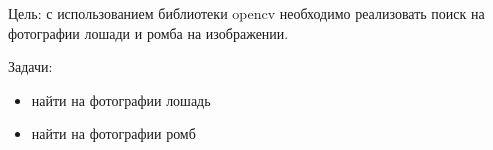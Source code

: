 
Цель: с использованием библиотеки opencv необходимо реализовать поиск на фотографии лошади и ромба на изображении.

Задачи:
\begin{itemize}
    \item найти на фотографии лошадь
    \item найти на фотографии ромб
\end{itemize}

\clearpage
